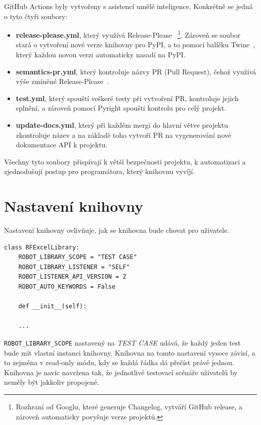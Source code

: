 GitHub Actions byly vytvořeny s asistencí umělé inteligence. Konkrétně se jedná o tyto čtyři soubory:

\begin{itemize}
    \item \textbf{release-please.yml}\label{release-please}, který využívá Release-Please~\cite{ReleasePlease} \footnote{Rozhraní od Googlu, které generuje Changelog, vytváří GitHub release, a zároveň automaticky povyšuje verze projektů.}. Zároveň se soubor stará o vytvoření nové verze knihovny pro PyPI, a to pomocí balíčku Twine~\cite{twine}, který každou novou verzi automaticky nasadí na PyPI.
    \item \textbf{semantics-pr.yml}, který kontroluje názvy PR (Pull Request), čehož využívá výše zmíněné Release-Please~\cite{Semantics}.
    \item \textbf{test.yml}, který spouští veškeré testy při vytvoření PR, kontroluje jejich splnění, a zároveň pomocí Pyright spouští kontrolu pro celý projekt.
    \item \textbf{update-docs.yml}, který při každém mergi do hlavní větve projektu zkontroluje název a na základě toho vytvoří PR na vygenerování nové dokumentace API k projektu.
\end{itemize}

Všechny tyto soubory přispívají k větší bezpečnosti projektu, k automatizaci a zjednodušují postup pro programátora, který knihovnu vyvíjí. 

\section{Nastavení knihovny}

Nastavení knihovny ovlivňuje, jak se knihovna bude chovat pro uživatele. 

\begin{listing}[H]
    \begin{verbatim}
class RFExcelLibrary:
    ROBOT_LIBRARY_SCOPE = "TEST CASE"
    ROBOT_LIBRARY_LISTENER = "SELF"
    ROBOT_LISTENER_API_VERSION = 2
    ROBOT_AUTO_KEYWORDS = False

    def __init__(self):
    
    ...
    \end{verbatim}
    
    \caption{Nastavení knihovny - vlastní tvorba}
    \label{list:demo-library}
\end{listing}

\texttt{ROBOT\_LIBRARY\_SCOPE} nastavený na \textit{TEST CASE} udává, že každý jeden test bude mít vlastní instanci knihovny. Knihovna na tomto nastavení vysoce závisí, a to zejména v read-only módu, kdy se každá řádka dá přečíst právě jednou. Knihovna je navíc navržena tak, že jednotlivé testovací scénáře uživatelů by neměly být jakkoliv propojené.

